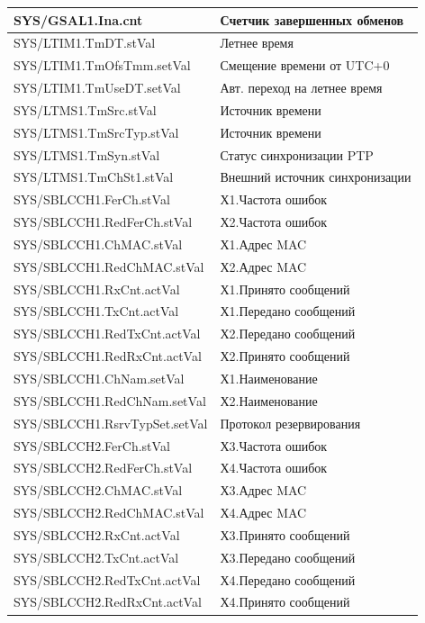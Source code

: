 \begin{longtable}{|>{\raggedright\arraybackslash}m{}|>{\raggedright\arraybackslash}m{}|}
\hline
SYS/GSAL1.Ina.cnt & Счетчик завершенных обменов \\
\hline
SYS/LTIM1.TmDT.stVal & Летнее время \\
\hline
SYS/LTIM1.TmOfsTmm.setVal & Смещение времени от UTC+0 \\
\hline
SYS/LTIM1.TmUseDT.setVal & Авт. переход на летнее время \\
\hline
SYS/LTMS1.TmSrc.stVal & Источник времени \\
\hline
SYS/LTMS1.TmSrcTyp.stVal & Источник времени \\
\hline
SYS/LTMS1.TmSyn.stVal & Статус синхронизации PTP \\
\hline
SYS/LTMS1.TmChSt1.stVal & Внешний источник синхронизации \\
\hline
SYS/SBLCCH1.FerCh.stVal & Х1.Частота ошибок \\
\hline
SYS/SBLCCH1.RedFerCh.stVal & Х2.Частота ошибок \\
\hline
SYS/SBLCCH1.ChMAC.stVal & Х1.Адрес MAC \\
\hline
SYS/SBLCCH1.RedChMAC.stVal & Х2.Адрес MAC \\
\hline
SYS/SBLCCH1.RxCnt.actVal & Х1.Принято сообщений \\
\hline
SYS/SBLCCH1.TxCnt.actVal & Х1.Передано сообщений \\
\hline
SYS/SBLCCH1.RedTxCnt.actVal & Х2.Передано сообщений \\
\hline
SYS/SBLCCH1.RedRxCnt.actVal & Х2.Принято сообщений \\
\hline
SYS/SBLCCH1.ChNam.setVal & Х1.Наименование \\
\hline
SYS/SBLCCH1.RedChNam.setVal & Х2.Наименование \\
\hline
SYS/SBLCCH1.RsrvTypSet.setVal & Протокол резервирования \\
\hline
SYS/SBLCCH2.FerCh.stVal & Х3.Частота ошибок \\
\hline
SYS/SBLCCH2.RedFerCh.stVal & Х4.Частота ошибок \\
\hline
SYS/SBLCCH2.ChMAC.stVal & Х3.Адрес MAC \\
\hline
SYS/SBLCCH2.RedChMAC.stVal & Х4.Адрес MAC \\
\hline
SYS/SBLCCH2.RxCnt.actVal & Х3.Принято сообщений \\
\hline
SYS/SBLCCH2.TxCnt.actVal & Х3.Передано сообщений \\
\hline
SYS/SBLCCH2.RedTxCnt.actVal & Х4.Передано сообщений \\
\hline
SYS/SBLCCH2.RedRxCnt.actVal & Х4.Принято сообщений \\

\end{longtable}
